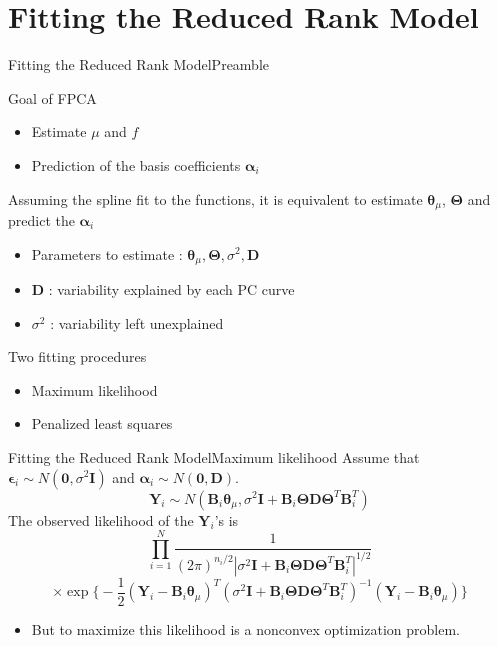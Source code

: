 \documentclass{beamer}
\def \bY {\mathbf{Y}}
\def \btheta {\boldsymbol{\theta}}
\def \bTheta {\boldsymbol{\Theta}}
\def \bepsilon {\boldsymbol{\epsilon}}
\def \balpha {\boldsymbol{\alpha}}
\begin{document}
\section{Fitting the Reduced Rank Model}
\begin{frame}{Fitting the Reduced Rank Model}{Preamble}
	\begin{block}{Goal of FPCA}
		\begin{itemize}
			\item {
				Estimate $\mu$ and $f$
			}
			\item {
				Prediction of the basis coefficients $\balpha_i$
			}
		\end{itemize}
	\end{block}
	Assuming the spline fit to the functions, it is equivalent to estimate $\btheta_{\mu}$, $\bTheta$ and predict the $\balpha_i$
	\begin{itemize}
		\item {
			Parameters to estimate : $\btheta_{\mu}, \bTheta, \sigma^2, \mathbf{D}$
		}
		\item {
			$\mathbf{D}$ : variability explained by each PC curve
		}
		\item {
			$\sigma^2$ : variability left unexplained
		}
	\end{itemize}
	\begin{block}{Two fitting procedures}
		\begin{itemize}
			\item {
				Maximum likelihood
			}
			\item {
				Penalized least squares
			}
		\end{itemize}
	\end{block}
\end{frame}

\begin{frame}{Fitting the Reduced Rank Model}{Maximum likelihood}
	Assume that $\bepsilon_i \sim N(\mathbf{0},\sigma^2 \mathbf{I})$ and $\balpha_i \sim N(\mathbf{0}, \mathbf{D})$.
	$$ \bY_i \sim N(\mathbf{B}_i\btheta_{\mu}, \sigma^2\mathbf{I}+\mathbf{B}_i\bTheta\mathbf{D}\bTheta^T\mathbf{B}^T_i) $$
	The observed likelihood of the $\bY_i$'s is
	$$ \prod_{i=1}^N \frac{1}{(2\pi)^{n_i/2}|\sigma^2\mathbf{I}+\mathbf{B}_i\bTheta\mathbf{D}\bTheta^T\mathbf{B}^T_i|^{1/2}} $$
	$$ \times \exp \bigg \{ -\frac{1}{2}(\bY_i-\mathbf{B}_i\btheta_{\mu})^T(\sigma^2\mathbf{I}+\mathbf{B}_i\bTheta\mathbf{D}\bTheta^T\mathbf{B}^T_i)^{-1} (\bY_i-\mathbf{B}_i\btheta_{\mu}) \bigg \} $$
	\begin{itemize}
		\item {
			But to maximize this likelihood is a nonconvex optimization problem.
		}
	\end{itemize}	
\end{frame}
\end{document}
